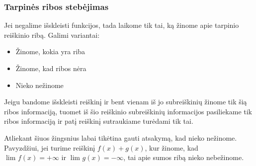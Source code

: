     \subsubsection{Tarpinės ribos stebėjimas}
        Jei negalime išskleisti funkcijos, tada laikome tik tai, ką žinome apie tarpinio reiškinio ribą. Galimi variantai:
        \begin{itemize}
            \item Žinome, kokia yra riba
            \item Žinome, kad ribos nėra
            \item Nieko nežinome
        \end{itemize}
        Jeigu bandome išskleisti reiškinį ir bent vienam iš jo subreiškinių žinome tik šią ribos informaciją, tuomet iš 
        šio reiškinio subreiškinių informacijos pasiliekame tik ribos informaciją ir patį reiškinį sutraukiame turėdami
        tik tai.

        Atliekant šiuos žingsnius labai tikėtina gauti atsakymą, kad nieko nežinome. Pavyzdžiui, jei turime reiškinį
        $f(x) + g(x)$, kur žinome, kad $\lim_{} f(x) = +\infty$ ir $\lim_{} g(x) = -\infty$, tai apie sumos ribą nieko nebežinome.

	
	